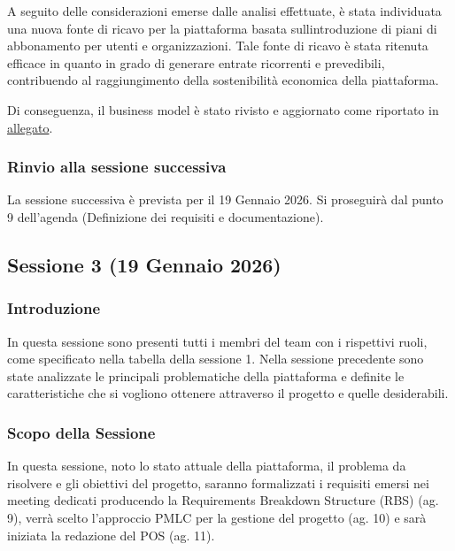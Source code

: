 \documentclass[11pt,a4paper]{article}
\begin{document}
{A seguito delle considerazioni emerse dalle analisi effettuate, è stata individuata una nuova fonte di ricavo per la piattaforma basata sull\textquotesingle introduzione di piani di abbonamento per utenti e organizzazioni. Tale fonte di ricavo è stata ritenuta efficace in quanto in grado di generare entrate ricorrenti e prevedibili, contribuendo al raggiungimento della sostenibilità economica della piattaforma.}

{Di conseguenza, il business model è stato rivisto e aggiornato come riportato in \hyperref[sec:bmodel]{allegato}.}

\subsubsection{\texorpdfstring{{Rinvio alla sessione successiva}}{Rinvio alla sessione successiva}}\label{h.aovsgqf1ob14}

{La sessione successiva è prevista per il 19 Gennaio 2026. Si proseguirà dal punto 9 dell’agenda (Definizione dei requisiti e documentazione).}

\subsection{\texorpdfstring{{Sessione 3 (19 Gennaio 2026)}}{Sessione 3 (19 Gennaio 2026)}}\label{h.h2tyccmveb69}

\subsubsection{\texorpdfstring{{Introduzione}}{Introduzione}}\label{h.jura89ccm4wv}

{In questa sessione sono presenti tutti i membri del team con i rispettivi ruoli, come specificato nella tabella della sessione 1. Nella sessione precedente sono state analizzate le principali problematiche della piattaforma e definite le caratteristiche che si vogliono ottenere attraverso il progetto e quelle desiderabili.}

\subsubsection{\texorpdfstring{{Scopo della Sessione}}{Scopo della Sessione}}\label{h.y1g7ar8zrkqg}

{In questa sessione, noto lo stato attuale della piattaforma, il problema da risolvere e gli obiettivi del progetto, saranno formalizzati i requisiti emersi nei meeting dedicati producendo la Requirements Breakdown Structure (RBS) (ag. 9), verrà scelto l’approccio PMLC per la gestione del progetto (ag. 10) e sarà iniziata la redazione del POS (ag. 11).}
\end{document}
